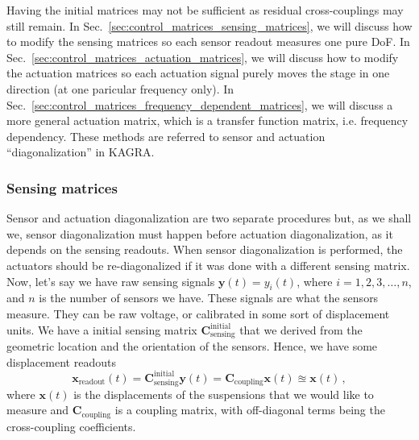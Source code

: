 Having the initial matrices may not be sufficient as residual cross-couplings may still remain.
In Sec.~\ref{sec:control_matrices_sensing_matrices}, we will discuss how to modify the sensing matrices so each sensor readout measures one pure DoF.
In Sec.~\ref{sec:control_matrices_actuation_matrices}, we will discuss how to modify the actuation matrices so each actuation signal purely moves the stage in one direction (at one paricular frequency only).
In Sec.~\ref{sec:control_matrices_frequency_dependent_matrices}, we will discuss a more general actuation matrix, which is a transfer function matrix, i.e. frequency dependency.
These methods are referred to sensor and actuation ``diagonalization'' in KAGRA.


\subsubsection{Sensing matrices \label{sec:control_matrices_sensing_matrices}}
Sensor and actuation diagonalization are two separate procedures but, as we shall we, sensor diagonalization must happen before actuation diagonalization, as it depends on the sensing readouts.
When sensor diagonalization is performed, the actuators should be re-diagonalized if it was done with a different sensing matrix.
Now, let's say we have raw sensing signals $\mathbf{y}(t)=y_i(t)$, where $i=1,2,3,\dots,n$, and $n$ is the number of sensors we have.
These signals are what the sensors measure.
They can be raw voltage, or calibrated in some sort of displacement units.
We have a initial sensing matrix $\mathbf{C}_\mathrm{sensing}^\mathrm{initial}$ that we derived from the geometric location and the orientation of the sensors.
Hence, we have some displacement readouts
\begin{equation}
	\mathbf{x}_\mathrm{readout}(t)=\mathbf{C}_\mathrm{sensing}^\mathrm{initial}\mathbf{y}(t)=\mathbf{C}_\mathrm{coupling}\mathbf{x}(t)\approxeq\mathbf{x}(t)\,,
\end{equation}
where $\mathbf{x}(t)$ is the displacements of the suspensions that we would like to measure and $\mathbf{C}_\mathrm{coupling}$ is a coupling matrix, with off-diagonal terms being the cross-coupling coefficients.

